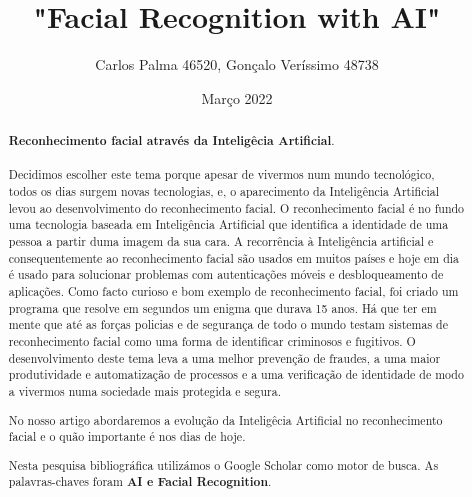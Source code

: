 \documentclass{article}
\title{"Facial Recognition with AI"}
\author{Carlos Palma 46520, Gonçalo Veríssimo 48738}
\date{Março 2022}
\begin{document}
\maketitle
\begin{abstract}

\textbf{Reconhecimento facial através da Inteligêcia Artificial}.
\paragraph{}
Decidimos escolher este tema porque apesar de vivermos num mundo tecnológico, 
todos os dias surgem novas tecnologias, e, o aparecimento
da Inteligência Artificial levou ao desenvolvimento do reconhecimento facial. 
O reconhecimento facial é no fundo uma tecnologia baseada em Inteligência Artificial que identifica a identidade de uma pessoa a partir duma imagem da sua cara.
A recorrência à Inteligência artificial e consequentemente ao reconhecimento facial são usados em muitos países e hoje em dia é usado para solucionar problemas com autenticações móveis e 
desbloqueamento de aplicações. Como facto curioso e bom exemplo de reconhecimento facial,
foi criado um programa que resolve em segundos um enigma que durava 15 anos.
Há que ter em mente que até as forças policias e de segurança de todo o mundo testam sistemas de reconhecimento
facial como uma forma de identificar criminosos e fugitivos.
O desenvolvimento deste tema leva a uma melhor prevenção de fraudes, 
a uma maior produtividade e automatização de processos e
a uma verificação de identidade de modo a vivermos numa sociedade mais protegida e segura.

No nosso artigo abordaremos a evolução da Inteligêcia Artificial no reconhecimento facial e o quão importante é nos dias de hoje.

Nesta pesquisa bibliográfica utilizámos o Google Scholar como motor de busca. As palavras-chaves foram \textbf{AI e Facial Recognition}.
\end{abstract}

    \cite{a}
    \cite{b}
    \cite{c}
    \cite{d}
    \cite{e}
    \cite{f}
    \cite{g}
    


\end{document}
